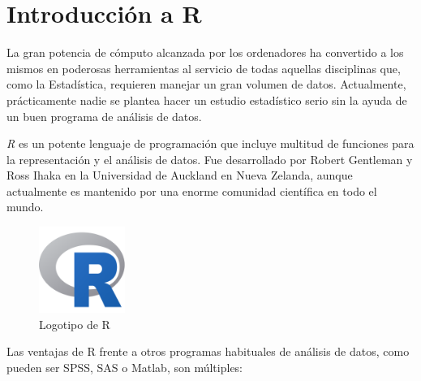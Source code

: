 \documentclass[
  a4paper,
]{scrreport}
\theoremstyle{definition}
\theoremstyle{definition}
\theoremstyle{remark}
\begin{document}

\hypertarget{introducciuxf3n-a-r}{%
\chapter{Introducción a R}\label{introducciuxf3n-a-r}}

La gran potencia de cómputo alcanzada por los ordenadores ha convertido
a los mismos en poderosas herramientas al servicio de todas aquellas
disciplinas que, como la Estadística, requieren manejar un gran volumen
de datos. Actualmente, prácticamente nadie se plantea hacer un estudio
estadístico serio sin la ayuda de un buen programa de análisis de datos.

\emph{R} es un potente lenguaje de programación que incluye multitud de
funciones para la representación y el análisis de datos. Fue
desarrollado por Robert Gentleman y Ross Ihaka en la Universidad de
Auckland en Nueva Zelanda, aunque actualmente es mantenido por una
enorme comunidad científica en todo el mundo.

\begin{figure}

{\centering \includegraphics[width=0.25\textwidth,height=\textheight]{./img/logos/Rlogo.png}

}

\caption{Logotipo de R}

\end{figure}

Las ventajas de R frente a otros programas habituales de análisis de
datos, como pueden ser SPSS, SAS o Matlab, son múltiples:
\end{document}
